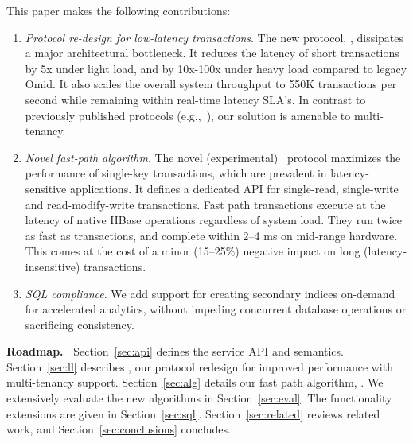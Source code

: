 This paper makes the following contributions: 
\begin{enumerate}
    \setlength{\itemsep}{1pt}
    \setlength{\parskip}{1pt}
    \setlength{\parsep}{1pt}  

\item {\em Protocol re-design for low-latency transactions}. 
The new protocol,  \sysll, dissipates a major architectural bottleneck. 
It reduces the latency of short transactions by 5x under light load, and 
by 10x-100x under heavy load compared to legacy Omid. It also scales 
the overall system throughput to 550K transactions per second while remaining 
within real-time latency SLA's. In contrast to previously published protocols 
(e.g.,~\cite{Percolator2010}), our solution is amenable to multi-tenancy.

\item {\em Novel fast-path algorithm}. The  novel (experimental) \sys\ protocol  
maximizes the performance of  single-key transactions, which are prevalent 
in latency-sensitive applications. It defines a dedicated API for single-read, 
single-write and read-modify-write transactions.  Fast path transactions execute at the 
latency of native HBase operations regardless of system load.
They run twice as fast as \sysll\/ transactions, and complete within 2--4 ms on mid-range hardware. 
This comes at the cost of a minor (15--25$\%$) negative impact on long (latency-insensitive) transactions.  

\item {\em SQL compliance\/}. We add support for creating 
secondary indices on-demand for accelerated analytics, without impeding concurrent database operations
or sacrificing consistency. 

\end{enumerate}

{\bf Roadmap.\ }
 Section~\ref{sec:api} defines  the service API and semantics. Section~\ref{sec:ll} describes \sysll, 
 our protocol redesign for improved performance with multi-tenancy support.  
Section~\ref{sec:alg} details our fast path algorithm, \sys.
We extensively evaluate the new algorithms in Section~\ref{sec:eval}.  
The functionality extensions are given in Section~\ref{sec:sql}.  
Section~\ref{sec:related} reviews related work, and  Section~\ref{sec:conclusions} concludes.



